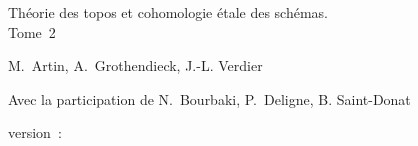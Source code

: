 \documentclass[12pt]{../fichiers-configuration-latex/amsbook}
\begin{document}
\begin{center}
{\Large Théorie des topos et cohomologie étale des schémas.\\
Tome 2}
\end{center}

\vskip1cm
\begin{center}
M. Artin, A. Grothendieck, J.-L. Verdier
\end{center}

\vskip1cm
\begin{center}
Avec la participation de N. Bourbaki, P. Deligne, B. Saint-Donat
\end{center}

version : \showgitstatus{}
\tableofcontents

\mainmatter

\def\danslelivre{1}

\setcounter{chapter}{4}
\def\thechapter{\Roman{chapter}}
\def\chaptername{Exposé}


\renewcommand*{\thechapter}{Vbis}

\setcounter{chapter}{5}
\def\thechapter{\Roman{chapter}}




\backmatter
\end{document}
